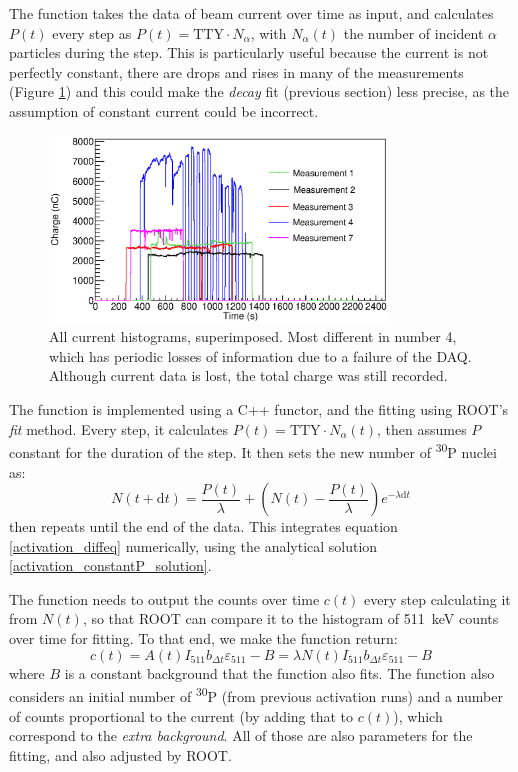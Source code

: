 \documentclass[a4paper,12pt]{report}
\newcommand{\dif}{\text{d}}
\newcommand{\Piso}{\textsuperscript{30}P }
\begin{document}
The function takes the data of beam current over time as input, and calculates $P(t)$ every step as $P(t) = \text{TTY}\cdot N_\alpha$, with $N_\alpha(t)$ the number of incident $\alpha$ particles during the step.
This is particularly useful because the current is not perfectly constant, there are drops and rises in many of the measurements (Figure \ref{current_histograms}) and this could make the \textit{decay} fit (previous section) less precise, as the assumption of constant current could be incorrect.
\\
\begin{figure}[H]
	\centering
	\includegraphics[width=0.80\textwidth]{current_histograms.eps}
	\caption{All current histograms, superimposed.
	Most different in number 4, which has periodic losses of information due to a failure of the DAQ.
	Although current data is lost, the total charge was still recorded.}
	\label{current_histograms}
\end{figure}

The function is implemented using a C++ functor, and the fitting using ROOT's \textit{fit} method.
Every step, it calculates $P(t) = \text{TTY}\cdot N_\alpha(t)$, then assumes $P$ constant for the duration of the step.
It then sets the new number of \Piso nuclei as:
\begin{equation}
	N(t+\dif t)=\frac{P(t)}{\lambda} + \left( N(t)-\frac{P(t)}{\lambda} \right) e^{-\lambda \dif t}
\end{equation}
then repeats until the end of the data.
This integrates equation \ref{activation_diffeq} numerically, using the analytical solution \ref{activation_constantP_solution}.

The function needs to output the counts over time $c(t)$ every step calculating it from $N(t)$, so that ROOT can compare it to the histogram of \qty{511}{\keV} counts over time for fitting.
To that end, we make the function return:
\[ c(t) = A(t)I_{511}b_{\Delta t}\varepsilon_{511} - B = \lambda N(t) I_{511}b_{\Delta t}\varepsilon_{511} - B\]
where $B$ is a constant background that the function also fits.
The function also considers an initial number of \Piso (from previous activation runs) and a number of counts proportional to the current (by adding that to $c(t)$), which correspond to the \textit{extra background}.
All of those are also parameters for the fitting, and also adjusted by ROOT.
\end{document}
